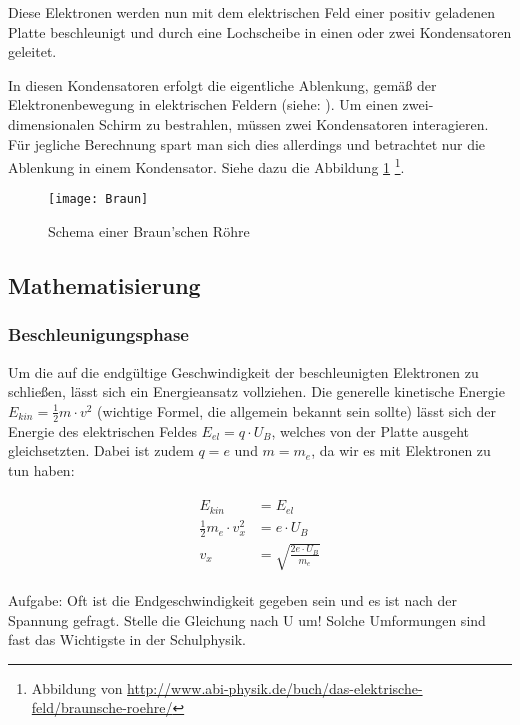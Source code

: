 Diese Elektronen werden nun mit dem elektrischen Feld einer positiv geladenen Platte beschleunigt und durch eine Lochscheibe in einen oder zwei Kondensatoren geleitet.

In diesen Kondensatoren erfolgt die eigentliche Ablenkung, gemäß der Elektronenbewegung in elektrischen Feldern (siehe: ). Um einen zwei-dimensionalen Schirm zu bestrahlen, müssen zwei Kondensatoren interagieren. Für jegliche Berechnung spart man sich dies allerdings und betrachtet nur die Ablenkung in einem Kondensator. Siehe dazu die Abbildung \ref{fig:BraunscheRoehre} \footnote{Abbildung von \url{http://www.abi-physik.de/buch/das-elektrische-feld/braunsche-roehre/}}.

\begin{figure}[h!] 
	\centering
	\texttt{[image: Braun]}
	\caption{Schema einer Braun'schen Röhre}
	\label{fig:BraunscheRoehre}
\end{figure}

\subsection{Mathematisierung}

\subsubsection{Beschleunigungsphase}

Um die auf die endgültige Geschwindigkeit der beschleunigten Elektronen zu schließen, lässt sich ein Energieansatz vollziehen. Die generelle kinetische Energie $E_{kin}=\frac{1}{2}m \cdot v^2$ (wichtige Formel, die allgemein bekannt sein sollte) lässt sich der Energie des elektrischen Feldes $E_{el}=q \cdot U_B$, welches von der Platte ausgeht gleichsetzten. Dabei ist zudem $q = e$ und $m = m_e$, da wir es mit Elektronen zu tun haben:

\begin{align} \label{eq:BeschleunigungNachV}
\begin{split}
	E_{kin} &= E_{el} \\
	\frac{1}{2}m_e \cdot v_{x}^2 &= e \cdot U_B \\
	v_x &= \sqrt{\frac{2e \cdot U_B}{m_e}}
\end{split}
\end{align}

\begin{leftbar}
Aufgabe: Oft ist die Endgeschwindigkeit gegeben sein und es ist nach der Spannung gefragt. Stelle die Gleichung nach U um! Solche Umformungen sind fast das Wichtigste in der Schulphysik.
\end{leftbar}


